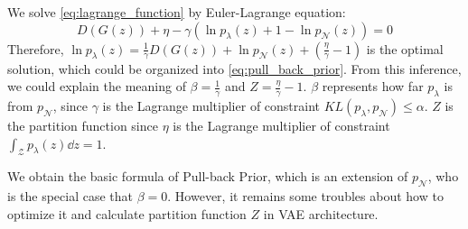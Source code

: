 We solve \cref{eq:lagrange_function} by Euler-Lagrange equation:
\begin{equation*}\label{eq:euler_lagrange_eqaution}
	D(G(z)) + \eta - \gamma (\ln p_\lambda(z) + 1 - \ln p_\mathcal{N}(z)) = 0 \tag{8}
\end{equation*}
Therefore, $\ln p_\lambda(z) = \frac{1}{\gamma} D(G(z)) + \ln p_\mathcal{N}(z) + (\frac{\eta}{\gamma} - 1)$ is the optimal solution, which could be organized into \cref{eq:pull_back_prior}. From this inference, we could explain the meaning of $\beta = \frac{1}{\gamma}$ and $Z = \frac{\eta}{\gamma} - 1$. $\beta$ represents how far $p_\lambda$ is from $p_\mathcal{N}$, since $\gamma$ is the Lagrange multiplier of constraint $KL(p_\lambda, p_\mathcal{N}) \leq \alpha$. $Z$ is the partition function since $\eta$ is the Lagrange multiplier of constraint $\int_{\mathcal{Z}} p_\lambda(z) \dd z = 1$.

We obtain the basic formula of Pull-back Prior, which is an extension of $p_\mathcal{N}$, who is the special case that $\beta = 0$. However, it remains some troubles about how to optimize it and calculate partition function $Z$ in VAE architecture. 



